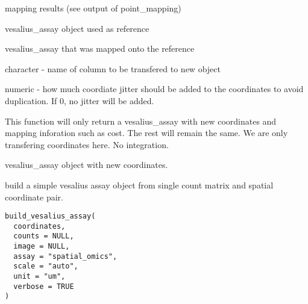 \documentclass[a4paper]{book}
\begin{document}
%
\begin{Arguments}
\begin{ldescription}
\item[\code{mapped}] mapping results (see output of point\_mapping)

\item[\code{seed\_assay}] vesalius\_assay object used as reference

\item[\code{query\_assay}] vesalius\_assay that was mapped onto the reference

\item[\code{meta\_labels}] character - name of column to be transfered to new object

\item[\code{jitter}] numeric - how much coordiate jitter should be added to the 
coordinates to avoid duplication. If 0, no jitter will be added.
\end{ldescription}
\end{Arguments}
%
\begin{Details}
This function will only return a vesalius\_assay with new coordinates
and mapping inforation such as cost. The rest will remain the same. We
are only transfering coordinates here. No integration.
\end{Details}
%
\begin{Value}
vesalius\_assay object with new coordinates.
\end{Value}
%
\begin{Description}
build a simple vesalius assay object from single count matrix and spatial
coordinate pair.
\end{Description}
%
\begin{Usage}
\begin{verbatim}
build_vesalius_assay(
  coordinates,
  counts = NULL,
  image = NULL,
  assay = "spatial_omics",
  scale = "auto",
  unit = "um",
  verbose = TRUE
)
\end{verbatim}
\end{Usage}
%
\end{document}
